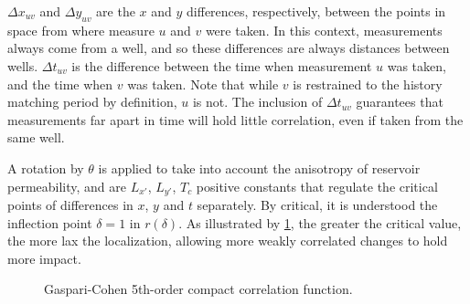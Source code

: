 $\Delta x_{uv}$ and $\Delta y_{uv}$ are the $x$ and $y$ differences, respectively, 
between the points in space from where measure $u$ and $v$ were taken.
In this context, measurements always come from a well, and so these differences are always distances between wells.
%
$\Delta t_{uv}$ is the difference between the time when measurement $u$ was taken, and the time when $v$ was taken.
Note that while $v$ is restrained to the history matching period by definition, $u$ is not.
The inclusion of $\Delta t_{uv}$ guarantees that measurements far apart in time will hold little correlation,
even if taken from the same well.

A rotation by $\theta$ is applied to take into account the anisotropy of reservoir permeability,
and are $L_{x'}$, $L_{y'}$, $T_c$ positive constants that regulate the critical points of differences in $x$, $y$ and $t$ separately.
%
By critical, it is understood the inflection point $\delta=1$ in $r(\delta)$.
%
As illustrated by \cref{fig:compact-correlation-function}, the greater the critical value, 
the more lax the localization, allowing more weakly correlated changes to hold more impact.

\begin{figure}[htbp]
    \centering
    \caption{%
        Gaspari-Cohen 5th-order compact correlation function.
    }
    \label{fig:compact-correlation-function}
    
\end{figure}